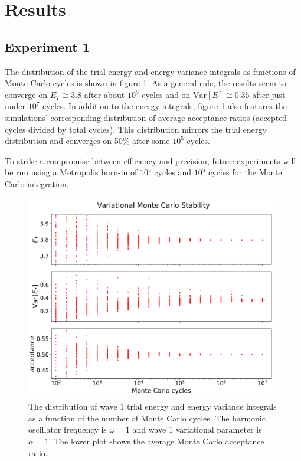 \documentclass[nofootinbib,reprint,english]{revtex4-1}
\begin{document}
\section{Results}
\subsection{Experiment 1}
The distribution of the trial energy and energy variance integrals as functions of Monte Carlo cycles is shown in figure \ref{fig:wave1_stability}. As a general rule, the results seem to converge on \(E_T\cong3.8\) after about \(10^5\) cycles and on \(\text{Var}[E]\cong0.35\) after just under \(10^7\) cycles. In addition to the energy integrals, figure \ref{fig:wave1_stability} also features the simulations' corresponding distribution of average acceptance ratios (accepted cycles divided by total cycles). This distribution mirrors the trial energy distribution and converges on 50\% after some \(10^5\) cycles.

To strike a compromise between efficiency and precision, future experiments will be run using a Metropolis burn-in of \(10^5\) cycles and \(10^5\) cycles for the Monte Carlo integration.

\begin{figure}
\centering
\includegraphics[scale=0.34]{../results/wave1/stability_2_edited.png}
\caption{The distribution of wave 1 trial energy and energy variance integrals as a function of the number of Monte Carlo cycles. The harmonic oscillator frequency is \(\omega=1\) and wave 1 variational parameter is \(\alpha=1\). The lower plot shows the average Monte Carlo acceptance ratio.}\label{fig:wave1_stability}
\end{figure}
\end{document}
